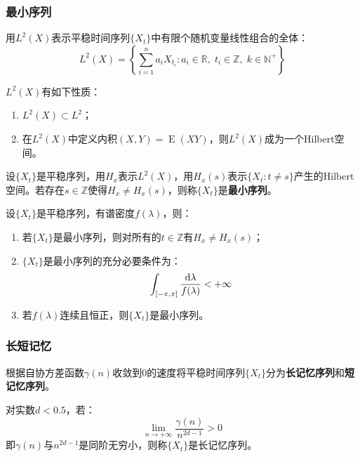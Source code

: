 \subsubsection{最小序列}
\begin{definition}
	用$L^2(X)$表示平稳时间序列$\{X_t\}$中有限个随机变量线性组合的全体：
	\begin{equation*}
		L^2(X)=\left\{\sum_{i=1}^{n}a_iX_{t_i}:a_i\in\mathbb{R},\;t_i\in\mathbb{Z},\;k\in\mathbb{N}^+\right\}
	\end{equation*}
\end{definition}
\begin{property}\label{prop:L2TSX}
	$L^2(X)$有如下性质：
	\begin{enumerate}
		\item $L^2(X)\subset L^2$；
		\item 在$L^2(X)$中定义内积$(X,Y)=\operatorname{E}(XY)$，则$L^2(X)$成为一个Hilbert空间。
	\end{enumerate}
\end{property}
\begin{definition}
	设$\{X_t\}$是平稳序列，用$H_x$表示$L^2(X)$，用$H_x(s)$表示$\{X_t:t\ne s\}$产生的Hilbert空间。若存在$s\in\mathbb{Z}$使得$H_x\ne H_x(s)$，则称$\{X_t\}$是\textbf{最小序列}。
\end{definition}
\begin{property}
	设$\{X_t\}$是平稳序列，有谱密度$f(\lambda)$，则：
	\begin{enumerate}
		\item 若$\{X_t\}$是最小序列，则对所有的$t\in\mathbb{Z}$有$H_x\ne H_x(s)$；
		\item $\{X_t\}$是最小序列的充分必要条件为：
		\begin{equation*}
			\int_{[-\pi,\pi]}\frac{\mathop{}\!\mathrm{d}\lambda}{f(\lambda)}<+\infty
		\end{equation*}
		\item 若$f(\lambda)$连续且恒正，则$\{X_t\}$是最小序列。
	\end{enumerate}
\end{property}
\subsubsection{长短记忆}
\begin{definition}
	根据自协方差函数$\gamma(n)$收敛到$0$的速度将平稳时间序列$\{X_t\}$分为\textbf{长记忆序列}和\textbf{短记忆序列}。\par
	对实数$d<0.5$，若：
	\begin{equation*}
		\lim_{n\to+\infty}\frac{\gamma(n)}{n^{2d-1}}>0
	\end{equation*}
	即$\gamma(n)$与$n^{2d-1}$是同阶无穷小，则称$\{X_t\}$是长记忆序列。
\end{definition}


